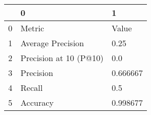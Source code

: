\begin{tabular}{lll}
\toprule
{} &                       0 &         1 \\
\midrule
0 &                  Metric &     Value \\
1 &       Average Precision &      0.25 \\
2 &  Precision at 10 (P@10) &       0.0 \\
3 &               Precision &  0.666667 \\
4 &                  Recall &       0.5 \\
5 &                Accuracy &  0.998677 \\
\bottomrule
\end{tabular}
